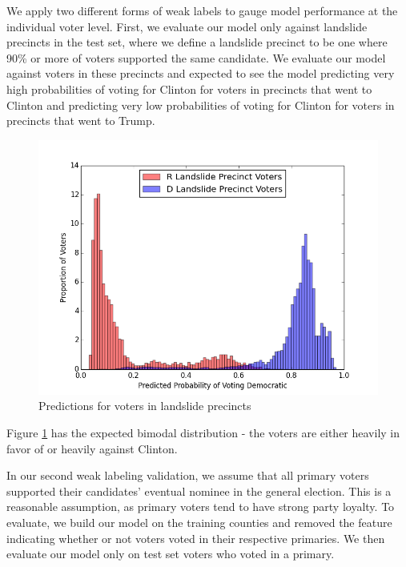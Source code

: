 \documentclass[10pt, letterpaper]{article}
\begin{document}
\begin{multicols}{2}
We apply two different forms of weak labels to gauge model performance at the individual voter level. First, we evaluate our model only against landslide precincts in the test set, where we define a landslide precinct to be one where 90\% or more of voters supported the same candidate. We evaluate our model against voters in these precincts and expected to see the model predicting very high probabilities of voting for Clinton for voters in precincts that went to Clinton and predicting very low probabilities of voting for Clinton for voters in precincts that went to Trump.

\begin{figure}[H]
\begin{center}
\includegraphics[scale=0.3]{lanslideHist19}
\end{center}
\caption{Predictions for voters in landslide precincts}
\label{fig:lanslideHist19}
\end{figure}

Figure \ref{fig:lanslideHist19} has the expected bimodal distribution - the voters are either heavily in favor of or heavily against Clinton.

In our second weak labeling validation, we assume that all primary voters supported their candidates' eventual nominee in the general election. This is a reasonable assumption, as primary voters tend to have strong party loyalty. To evaluate, we build our model on the training counties and removed the feature indicating whether or not voters voted in their respective primaries. We then evaluate our model only on test set voters who voted in a primary.


\end{multicols}
\end{document}

